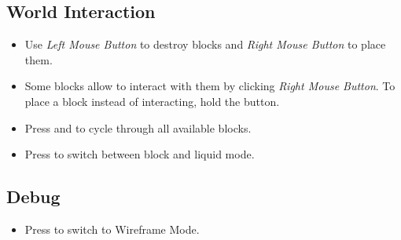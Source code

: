 \documentclass{article}
\begin{document}
    \subsection{World Interaction}\label{subsec:world-interaction}
    \begin{itemize}
        \item Use \textit{Left Mouse Button} to destroy blocks and \textit{Right Mouse Button} to place them.
        \item Some blocks allow to interact with them by clicking \textit{Right Mouse Button}. To place a block instead of interacting, hold the \keys{\ctrl} button.
        \item Press  and  to cycle through all available blocks.
        \item Press  to switch between block and liquid mode.
    \end{itemize}

    \subsection{Debug}\label{subsec:debug}
    \begin{itemize}
        \item Press  to switch to Wireframe Mode.
    \end{itemize}
\end{document}
